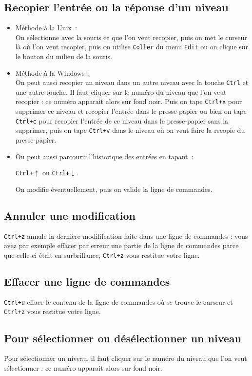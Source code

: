 \documentclass[a4paper,11pt]{article}
\begin{document}
\subsection{Recopier l'entr\'ee ou la r\'eponse d'un niveau}\label{sec:colle}
\begin{itemize}
\item M\'ethode \`a la Unix~:\\
On s\'electionne avec la souris ce que l'on veut recopier, puis on met le 
curseur l\`a o\`u l'on veut recopier, puis on utilise 
{\tt Coller} du menu {\tt Edit} ou on
clique sur le bouton du milieu de la souris.
\item
M\'ethode \`a la Windows~:\\
On peut aussi recopier un niveau dans un autre niveau avec la touche 
{\tt Ctrl} et une autre touche.
Il faut cliquer sur le num\'ero du niveau que l'on veut recopier :
ce num\'ero apparait alors sur fond noir. Puis on tape {\tt Ctrl+x} pour 
supprimer ce niveau et
recopier l'entr\'ee dans le presse-papier  ou bien on 
tape {\tt Ctrl+c} pour recopier l'entr\'ee de ce niveau dans le presse-papier 
sans la supprimer, 
puis on tape {\tt Ctrl+v} dans le niveau o\`u on veut faire la recopie
du presse-papier.
\item
Ou peut aussi parcourir l'historique des entr\'ees en tapant~:
\begin{center}
 {\tt Ctrl+}$\uparrow$ ou {\tt Ctrl+}$\downarrow$.
\end{center}
On modifie \'eventuellement, puis on valide la ligne de commandes.
\end{itemize}

\subsection{Annuler une modification}
{\tt Ctrl+z} annule la derni\`ere modififcation faite dans une ligne de 
commandes : vous avez par exemple effacer par erreur une partie de la ligne de 
commandes parce que celle-ci \'etait en surbrillance, {\tt Ctrl+z} vous 
restitue votre ligne. 

\subsection{Effacer une ligne de commandes}
{\tt Ctrl+u} efface le contenu de la ligne de commandes o\`u se trouve le 
curseur et {\tt Ctrl+z} vous 
restitue votre ligne. 

\subsection{Pour s\'electionner ou d\'es\'electionner un niveau}
Pour s\'electionner un niveau, il faut cliquer sur le num\'ero du niveau que 
l'on veut s\'electionner : ce num\'ero apparait alors sur fond noir.
\end{document}
